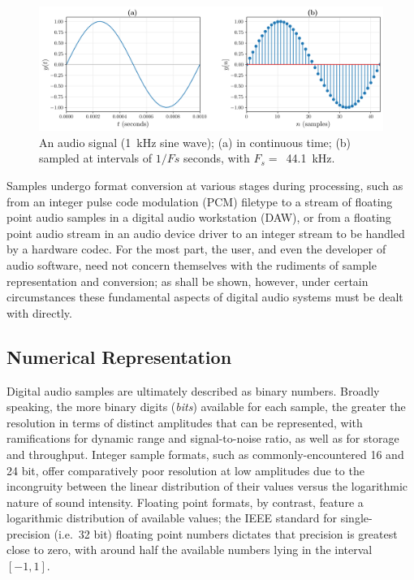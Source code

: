 \begin{figure}[ht]
    \centering
    \includegraphics[width=\textwidth]{figures/digital-signal}
    \caption{
        An audio signal (\qty{1}{\kHz} sine wave);
        (a) in continuous time;
        (b) sampled at intervals of $1/Fs$ seconds, with
        $F_s =$~\qty{44.1}{\kHz}.
    }
    \label{fig:signal-samples}
\end{figure}

Samples undergo format conversion at various stages during processing, such as
from an integer pulse code modulation (PCM) filetype to a stream of floating
point audio samples in a digital audio workstation (DAW), or from a floating
point audio stream in an audio device driver to an integer stream to be handled
by a hardware codec.
For the most part, the user, and even the developer of audio software, need not
concern themselves with the rudiments of sample representation and conversion;
as shall be shown, however, under certain circumstances these fundamental
aspects of digital audio systems must be dealt with directly.

\subsection{Numerical Representation}\label{subsec:numerical-representation}

Digital audio samples are ultimately described as binary numbers.
Broadly speaking, the more binary digits (\textit{bits}) available for each
sample, the greater the resolution in terms of distinct amplitudes that can be
represented, with ramifications for dynamic range and signal-to-noise ratio, as
well as for storage and throughput.
Integer sample formats, such as commonly-encountered 16 and 24 bit, offer
comparatively poor resolution at low amplitudes due to the incongruity between
the linear distribution of their values versus the logarithmic nature of sound
intensity.
Floating point formats, by contrast, feature a logarithmic distribution of
available values; the IEEE standard for single-precision (i.e.\ 32 bit) floating
point numbers\cite{} dictates that precision is greatest close to zero,
with around half the available numbers lying in the interval $[-1, 1]$.
